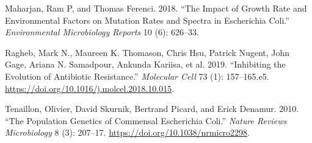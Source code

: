 \documentclass[
  12pt,
  letterpaper,
  DIV=11,
  numbers=noendperiod]{scrreprt}
\newlength{\cslhangindent}
\newlength{\cslentryspacingunit} %
\newenvironment{CSLReferences}[2] %
 {%
  \setlength{\parindent}{0pt}
  \ifodd #1
  \let\oldpar\par
  \def\par{\hangindent=\cslhangindent\oldpar}
  \fi
  \setlength{\parskip}{#2\cslentryspacingunit}
 }%
 {}
\begin{document}
\begin{CSLReferences}{1}{0}
\leavevmode{}%
Maharjan, Ram P, and Thomas Ferenci. 2018. {``The Impact of Growth Rate
and Environmental Factors on Mutation Rates and Spectra in Escherichia
Coli.''} \emph{Environmental Microbiology Reports} 10 (6): 626--33.

\leavevmode{}%
Ragheb, Mark N., Maureen K. Thomason, Chris Hsu, Patrick Nugent, John
Gage, Ariana N. Samadpour, Ankunda Kariisa, et al. 2019. {``Inhibiting
the Evolution of Antibiotic Resistance.''} \emph{Molecular Cell} 73 (1):
157--165.e5. \url{https://doi.org/10.1016/j.molcel.2018.10.015}.

\leavevmode{}%
Tenaillon, Olivier, David Skurnik, Bertrand Picard, and Erick Denamur.
2010. {``The Population Genetics of Commensal Escherichia Coli.''}
\emph{Nature Reviews Microbiology} 8 (3): 207--17.
\url{https://doi.org/10.1038/nrmicro2298}.

\end{CSLReferences}
\end{document}

